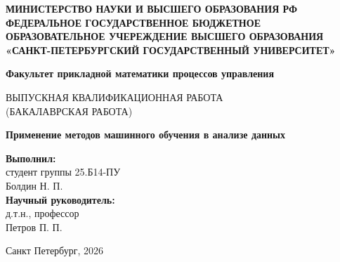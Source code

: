 \documentclass[a4paper,12pt]{article}
\begin{document}
\begin{titlepage}
    \centering
    \textbf{МИНИСТЕРСТВО НАУКИ И ВЫСШЕГО ОБРАЗОВАНИЯ РФ}\\
    \textbf{ФЕДЕРАЛЬНОЕ ГОСУДАРСТВЕННОЕ БЮДЖЕТНОЕ ОБРАЗОВАТЕЛЬНОЕ УЧЕРЕЖДЕНИЕ ВЫСШЕГО ОБРАЗОВАНИЯ «САНКТ-ПЕТЕРБУРГСКИЙ ГОСУДАРСТВЕННЫЙ УНИВЕРСИТЕТ»}
    
    \vspace{3cm}
    
    \textbf{Факультет прикладной математики процессов управления}
    
    \vspace{2cm}
    
    \large{ВЫПУСКНАЯ КВАЛИФИКАЦИОННАЯ РАБОТА} \\
    \small{(БАКАЛАВРСКАЯ РАБОТА)}
    
    \vspace{1cm}
    
    \huge{\textbf{Применение методов машинного обучения в анализе данных}}
    
    \vspace{3cm}
    
    \begin{flushright}
        \textbf{Выполнил:} \\
        студент группы 25.Б14-ПУ \\
        Болдин Н. П. \\
        \vspace{0.5cm}
        \textbf{Научный руководитель:} \\
        д.т.н., профессор \\
        Петров П. П.
    \end{flushright}
    
    \vfill
    
    Санкт Петербург, 2026
\end{titlepage}
\end{document}
